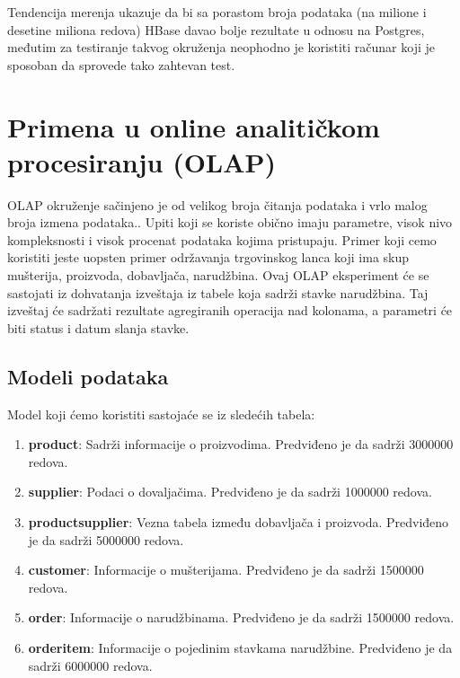 \documentclass[12pt,oneside]{memoir}
\begin{document}
\pagebreak

Tendencija merenja ukazuje da bi sa porastom broja podataka (na milione i desetine miliona redova) HBase davao bolje rezultate u odnosu na Postgres, međutim za testiranje takvog okruženja neophodno je koristiti računar koji je sposoban da sprovede tako zahtevan test.


\section{Primena u online analitičkom procesiranju (OLAP)}

OLAP okruženje sačinjeno je od velikog broja čitanja podataka i vrlo malog broja izmena podataka.. Upiti koji se koriste obično imaju parametre, visok nivo kompleksnosti i visok procenat podataka kojima pristupaju.
Primer koji cemo koristiti jeste uopsten primer održavanja trgovinskog lanca koji ima skup mušterija, proizvoda, dobavljača,  narudžbina. 
Ovaj OLAP eksperiment će se sastojati iz dohvatanja izveštaja iz tabele koja sadrži stavke narudžbina. Taj izveštaj će sadržati rezultate agregiranih operacija nad kolonama, a parametri će biti status i datum slanja stavke.

\subsection{Modeli podataka}

Model koji ćemo koristiti sastojaće se iz sledećih tabela:

\begin{enumerate}
\item[\textbullet] \textbf{product}: {
	Sadrži informacije o proizvodima. Predviđeno je da sadrži 3000000 redova.
}
\item[\textbullet] \textbf{supplier}:{
	Podaci o dovaljačima. Predviđeno je da sadrži 1000000 redova.
}
\item[\textbullet] \textbf{productsupplier}:{
	Vezna tabela između dobavljača i proizvoda. Predviđeno je da sadrži 5000000 redova.
}
\item[\textbullet] \textbf{customer}:{
	Informacije o mušterijama. Predviđeno je da sadrži 1500000 redova.
}
\item[\textbullet] \textbf{order}:{
	Informacije o narudžbinama. Predviđeno je da sadrži 1500000 redova.
}
\item[\textbullet] \textbf{orderitem}:{
	Informacije o pojedinim stavkama narudžbine. Predviđeno je da sadrži 6000000 redova.
}

\end{enumerate}
\end{document}
